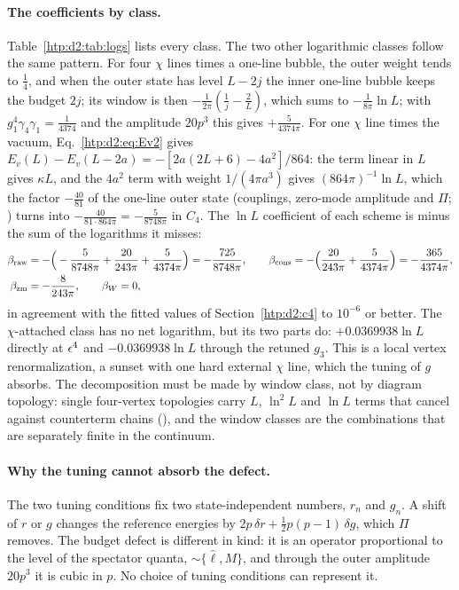 \paragraph{The coefficients by class.} Table~\ref{htp:d2:tab:logs} lists every class. The two other logarithmic classes follow the
same pattern. For four $\chi$ lines times a one-line bubble, the outer weight tends to $\frac14$, and when the outer state has level
$L-2j$ the inner one-line bubble keeps the budget $2j$; its window is then $-\frac1{2\pi}(\frac1j-\frac2L)$, which sums to
$-\frac1{8\pi}\ln L$; with
$g_1^4\gamma_4\gamma_1=\frac1{4374}$ and the amplitude $20p^3$ this gives $+\frac5{4374\pi}$. For one $\chi$ line times the vacuum,
Eq.~\eqref{htp:d2:eq:Ev2} gives $E_v(L)-E_v(L-2a)=-[2a(2L+6)-4a^2]/864$: the term linear in $L$ gives $\kappa L$, and the
$4a^2$ term with weight $1/(4\pi a^3)$ gives $(864\pi)^{-1}\ln L$, which the factor $-\frac{40}{81}$ of the one-line outer state (couplings,
zero-mode amplitude and $\Pi$; ) turns into $-\frac{40}{81\cdot864\pi}=-\frac5{8748\pi}$ in $C_4$. The $\ln L$ coefficient of each scheme is minus the sum of the logarithms it misses:
\begin{align}
 \beta_{\rm raw}&=-\Big(-\frac5{8748\pi}+\frac{20}{243\pi}+\frac5{4374\pi}\Big)=-\frac{725}{8748\pi},\qquad
 \beta_{\rm cons}=-\Big(\frac{20}{243\pi}+\frac5{4374\pi}\Big)=-\frac{365}{4374\pi},\nonumber\\
 \beta_{\rm zm}&=-\frac8{243\pi},\qquad \beta_W=0 ,
\end{align}
in agreement with the fitted values of Section~\ref{htp:d2:c4} to $10^{-6}$ or better. The $\chi$-attached class has no net
logarithm, but its two parts do: $+0.0369938\ln L$ directly at $\epsilon^4$ and $-0.0369938\ln L$ through the retuned $g_3$. This
is a local vertex renormalization, a sunset with one hard external $\chi$ line, which the tuning of $g$ absorbs. The
decomposition must be made by window class, not by diagram topology: single four-vertex topologies carry $L$, $\ln^2L$ and
$\ln L$ terms that cancel against counterterm chains (), and the window classes are the combinations that
are separately finite in the continuum.

\paragraph{Why the tuning cannot absorb the defect.} The two tuning conditions fix two state-independent numbers, $r_n$ and
$g_n$. A shift of $r$ or $g$ changes the reference energies by $2p\,\delta r+\frac12p(p-1)\,\delta g$, which $\Pi$ removes.
The budget defect is different in kind: it is an operator proportional to the level of the spectator quanta,
${\sim}\{\hat\ell,M\}$, and through the outer amplitude $20p^3$ it is cubic in $p$. No choice of tuning conditions can
represent it.


